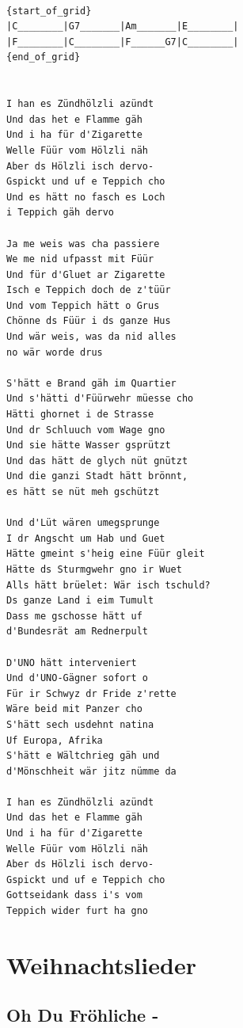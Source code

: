 \documentclass[]{book}
\let\stdsection\section
\renewcommand\section{\clearpage\stdsection}
\begin{document}
\begin{verbatim}

{start_of_grid}
|C________|G7_______|Am_______|E________|
|F________|C________|F______G7|C________|
{end_of_grid}


I han es Zündhölzli azündt
Und das het e Flamme gäh
Und i ha für d'Zigarette
Welle Füür vom Hölzli näh
Aber ds Hölzli isch dervo-
Gspickt und uf e Teppich cho
Und es hätt no fasch es Loch 
i Teppich gäh dervo

Ja me weis was cha passiere
We me nid ufpasst mit Füür
Und für d'Gluet ar Zigarette
Isch e Teppich doch de z'tüür
Und vom Teppich hätt o Grus
Chönne ds Füür i ds ganze Hus
Und wär weis, was da nid alles 
no wär worde drus

S'hätt e Brand gäh im Quartier
Und s'hätti d'Füürwehr müesse cho
Hätti ghornet i de Strasse
Und dr Schluuch vom Wage gno
Und sie hätte Wasser gsprützt
Und das hätt de glych nüt gnützt
Und die ganzi Stadt hätt brönnt, 
es hätt se nüt meh gschützt

Und d'Lüt wären umegsprunge
I dr Angscht um Hab und Guet
Hätte gmeint s'heig eine Füür gleit
Hätte ds Sturmgwehr gno ir Wuet
Alls hätt brüelet: Wär isch tschuld?
Ds ganze Land i eim Tumult
Dass me gschosse hätt uf 
d'Bundesrät am Rednerpult

D'UNO hätt interveniert
Und d'UNO-Gägner sofort o
Für ir Schwyz dr Fride z'rette
Wäre beid mit Panzer cho
S'hätt sech usdehnt natina
Uf Europa, Afrika
S'hätt e Wältchrieg gäh und 
d'Mönschheit wär jitz nümme da

I han es Zündhölzli azündt
Und das het e Flamme gäh
Und i ha für d'Zigarette
Welle Füür vom Hölzli näh
Aber ds Hölzli isch dervo-
Gspickt und uf e Teppich cho 
Gottseidank dass i's vom 
Teppich wider furt ha gno
\end{verbatim}

\hypertarget{weihnachtslieder}{%
\chapter{Weihnachtslieder}\label{weihnachtslieder}}

\hypertarget{oh-du-frohliche--}{%
\section{Oh Du Fröhliche -}\label{oh-du-frohliche--}}
\end{document}
